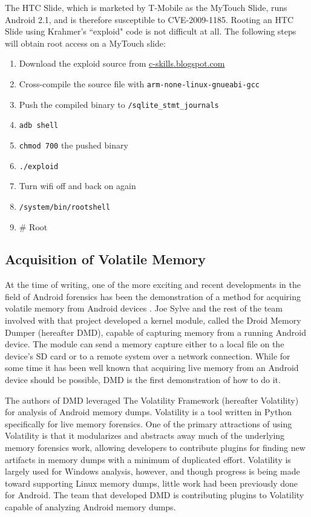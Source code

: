 The HTC Slide, which is marketed by T-Mobile as the MyTouch Slide, runs Android 2.1, and is therefore susceptible to CVE-2009-1185. 
Rooting an HTC Slide using Krahmer's ``exploid" code is not difficult at all. The following steps will obtain root access on a
MyTouch slide: 

\begin{enumerate}
	\item Download the exploid source from \url{c-skills.blogspot.com}
	\item Cross-compile the source file with \texttt{arm-none-linux-gnueabi-gcc}
	\item Push the compiled binary to \texttt{/sqlite\_stmt\_journals}
	\item \texttt{adb shell}
	\item \texttt{chmod 700} the pushed binary
	\item \texttt{./exploid}
	\item Turn wifi off and back on again
	\item \texttt{/system/bin/rootshell}
	\item {\# Root}
\end{enumerate}

\subsection{Acquisition of Volatile Memory}
At the time of writing, one of the more exciting and recent developments in the field of Android forensics has been the
demonstration of a method for acquiring volatile memory from Android devices \cite{dmd}. Joe Sylve and the rest of the team involved
with that project developed a kernel module, called the Droid Memory Dumper (hereafter DMD), capable of capturing memory from a
running Android device. The module can send a memory capture either to a local file on the device's SD card or to a
remote system over a network connection. While for some time it has been well known that acquiring live memory from an Android
device should be possible, DMD is the first demonstration of how to do it.

The authors of DMD leveraged The Volatility Framework (hereafter Volatility) for analysis of Android memory dumps. Volatility is a
tool written in Python specifically for live memory forensics. One of the primary attractions of using Volatility is that it
modularizes and abstracts away much of the underlying memory forensics work, allowing developers to contribute plugins for finding
new artifacts in memory dumps with a minimum of duplicated effort. Volatility is largely used for Windows analysis, however, and
though progress is being made toward supporting Linux memory dumps, little work had been previously done for Android. The team that
developed DMD is contributing plugins to Volatility capable of analyzing Android memory dumps. 

